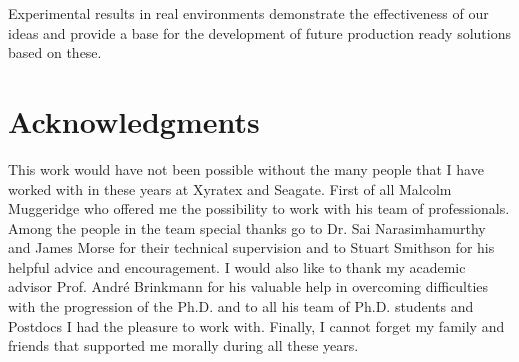 \documentclass[a4paper,titlepage,oneside,11pt]{book}
\begin{document}
Experimental results in real environments demonstrate the effectiveness of our ideas and provide a base for the development of future production ready solutions based on these.

\tableofcontents
\mainmatter


\setcounter{page}{5}
\chapter*{Acknowledgments}
This work would have not been possible without the many people that I have worked with in these years at Xyratex and Seagate. First of all Malcolm Muggeridge who offered me the possibility to work with his team of professionals.
Among the people in the team special thanks go to Dr. Sai Narasimhamurthy and James Morse for their technical supervision and to Stuart Smithson for his helpful advice and encouragement. I would also like to thank my academic advisor 
Prof. Andr\'e Brinkmann for his valuable help in overcoming difficulties with the progression of the Ph.D. and to all his team of Ph.D. students and Postdocs I had the pleasure to work with. Finally, I cannot forget my family and friends 
that supported me morally during all these years.

\newpage
{}\setcounter{page}{1}






\cleardoublepage


\cleardoublepage
{}
\end{document}

